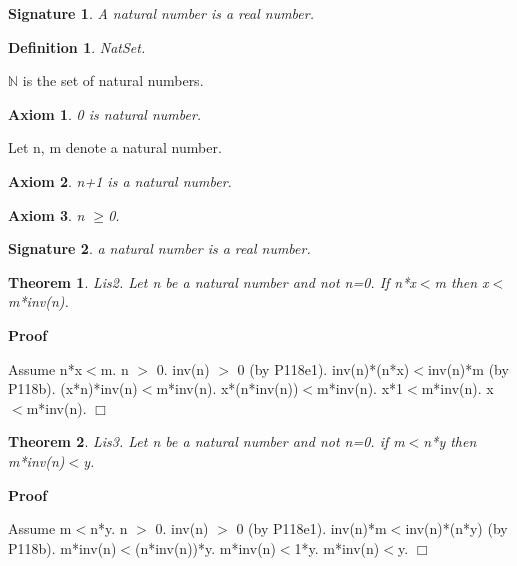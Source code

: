 \documentclass{article}
\newenvironment{forthel}{\begin{leftbar}}{\end{leftbar}}
\newenvironment{proof}{\noindent\textbf{Proof\ }}{\hspace*{\fill}$\Box$\medskip}
\newtheorem{axiom}{Axiom}
\newtheorem{theorem}{Theorem}
\newtheorem{definition}{Definition}
\newtheorem{signature}{Signature}
\begin{document}
\begin{forthel}
	\begin{signature} A natural number is a real number.

\end{signature}
	
	\begin{definition} NatSet.

\end{definition}
	$\mathbb{N}$ is the set of natural numbers.
	
	\begin{axiom} 0 is natural number.

\end{axiom}
	Let n, m denote a natural number.
	\begin{axiom} n+1 is a natural number.

\end{axiom}
	\begin{axiom} n $\geq$0.

\end{axiom}
	
	\begin{signature} a natural number is a real number.

\end{signature}
	
	

	
	\begin{theorem}
 Lis2. Let n be a natural number and not n=0. If n*x$<$m then x$<$m*inv(n).
\end{theorem}	\begin{proof}

	Assume n*x$<$m.
	n $>$ 0.
	inv(n) $>$ 0 (by P118e1).
	inv(n)*(n*x)$<$inv(n)*m (by P118b).
	(x*n)*inv(n)$<$m*inv(n).
	x*(n*inv(n))$<$m*inv(n).
	x*1$<$m*inv(n).
	x$<$m*inv(n).
	\end{proof}

	\begin{theorem}
 Lis3. Let n be a natural number and not n=0. if m$<$n*y then m*inv(n)$<$y.
\end{theorem}	\begin{proof}

	Assume m$<$n*y.
	n $>$ 0.
	inv(n) $>$ 0 (by P118e1).
	inv(n)*m$<$inv(n)*(n*y) (by P118b).
	m*inv(n)$<$(n*inv(n))*y.
	m*inv(n)$<$1*y.
	m*inv(n)$<$y.
	\end{proof}

\end{forthel}
\end{document}
